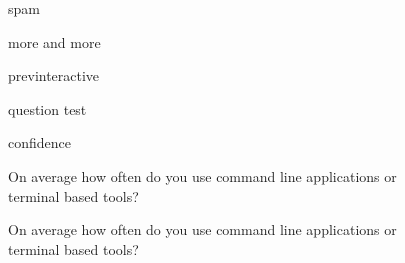 \begin{figure}[H]
	\scalebox{0.72}{}
	\caption{spam}
	\label{fig:uniexp}
\end{figure}

\begin{figure}[H]
	\scalebox{0.72}{}
	\caption{more and more}
	\label{fig:moreandmore}
\end{figure}

\begin{figure}[H]
	\centering
	\scalebox{0.72}{}
	\caption{previnteractive}
	\label{fig:previnteractive}
\end{figure}

\begin{figure}[H]
	\scalebox{0.72}{}
	\caption{question test}
	\label{fig:question}
\end{figure}

\begin{figure}[H]
	\centering
	\scalebox{0.67}{}
	\vspace{-4em}
	\caption{confidence}
	\label{fig:question}
\end{figure}

\begin{figure}[H]
	\centering
	\scalebox{0.67}{}
	\caption{On average how often do you use command line applications or terminal based tools?}
	\label{fig:question}
\end{figure}

\begin{figure}[H]
	\centering
	\scalebox{0.67}{}
	\caption{On average how often do you use command line applications or terminal based tools?}
	\label{fig:question}
\end{figure}


